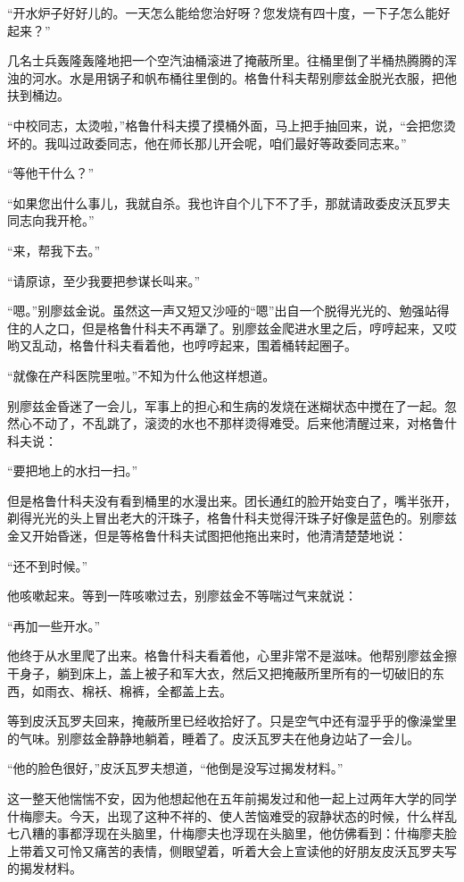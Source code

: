 “开水炉子好好儿的。一天怎么能给您治好呀？您发烧有四十度，一下子怎么能好起来？”

几名士兵轰隆轰隆地把一个空汽油桶滚进了掩蔽所里。往桶里倒了半桶热腾腾的浑浊的河水。水是用锅子和帆布桶往里倒的。格鲁什科夫帮别廖兹金脱光衣服，把他扶到桶边。

“中校同志，太烫啦，”格鲁什科夫摸了摸桶外面，马上把手抽回来，说，“会把您烫坏的。我叫过政委同志，他在师长那儿开会呢，咱们最好等政委同志来。”

“等他干什么？”

“如果您出什么事儿，我就自杀。我也许自个儿下不了手，那就请政委皮沃瓦罗夫同志向我开枪。”

“来，帮我下去。”

“请原谅，至少我要把参谋长叫来。”

“嗯。”别廖兹金说。虽然这一声又短又沙哑的“嗯”出自一个脱得光光的、勉强站得住的人之口，但是格鲁什科夫不再犟了。别廖兹金爬进水里之后，哼哼起来，又哎哟又乱动，格鲁什科夫看着他，也哼哼起来，围着桶转起圈子。

“就像在产科医院里啦。”不知为什么他这样想道。

别廖兹金昏迷了一会儿，军事上的担心和生病的发烧在迷糊状态中搅在了一起。忽然心不动了，不乱跳了，滚烫的水也不那样烫得难受。后来他清醒过来，对格鲁什科夫说：

“要把地上的水扫一扫。”

但是格鲁什科夫没有看到桶里的水漫出来。团长通红的脸开始变白了，嘴半张开，剃得光光的头上冒出老大的汗珠子，格鲁什科夫觉得汗珠子好像是蓝色的。别廖兹金又开始昏迷，但是等格鲁什科夫试图把他拖出来时，他清清楚楚地说：

“还不到时候。”

他咳嗽起来。等到一阵咳嗽过去，别廖兹金不等喘过气来就说：

“再加一些开水。”

他终于从水里爬了出来。格鲁什科夫看着他，心里非常不是滋味。他帮别廖兹金擦干身子，躺到床上，盖上被子和军大衣，然后又把掩蔽所里所有的一切破旧的东西，如雨衣、棉袄、棉裤，全都盖上去。

等到皮沃瓦罗夫回来，掩蔽所里已经收拾好了。只是空气中还有湿乎乎的像澡堂里的气味。别廖兹金静静地躺着，睡着了。皮沃瓦罗夫在他身边站了一会儿。

“他的脸色很好，”皮沃瓦罗夫想道，“他倒是没写过揭发材料。”

这一整天他惴惴不安，因为他想起他在五年前揭发过和他一起上过两年大学的同学什梅廖夫。今天，出现了这种不祥的、使人苦恼难受的寂静状态的时候，什么样乱七八糟的事都浮现在头脑里，什梅廖夫也浮现在头脑里，他仿佛看到：什梅廖夫脸上带着又可怜又痛苦的表情，侧眼望着，听着大会上宣读他的好朋友皮沃瓦罗夫写的揭发材料。

